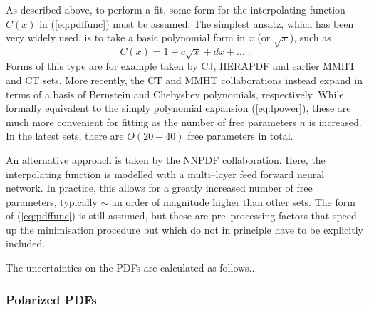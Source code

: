 As described above, to perform a fit, some form for the interpolating function $C(x)$ in (\ref{eq:pdffunc}) must be assumed. The simplest ansatz, which has been very widely used, is to take a basic polynomial form in $x$ (or $\sqrt{x}$), such as
\begin{equation}\label{eq:lpower}
C(x)=1+c\sqrt{x}+d x+...\;.
\end{equation}
Forms of this type are for example taken by CJ, HERAPDF and earlier MMHT and CT sets. More recently, the CT and MMHT collaborations instead expand in terms of a basis of  Bernstein and Chebyshev polynomials, respectively.
While formally equivalent to the simply polynomial expansion (\ref{eq:lpower}), these are much more convenient for fitting as the number of free parameters $n$ is increased. In the latest sets, there are $O(20-40)$ free parameters in total.

An alternative approach is taken by the NNPDF collaboration. Here, the interpolating function is modelled with a multi--layer feed forward neural network. In practice, this allows for a greatly increased number of free parameters, typically $\sim$ an order of magnitude higher than other sets. The form of (\ref{eq:pdffunc}) is still assumed, but these are pre--processing factors that speed up the minimisation procedure but which do not in principle have to be explicitly included. 

The uncertainties on the PDFs are calculated as follows...

\subsubsection{Polarized PDFs}



